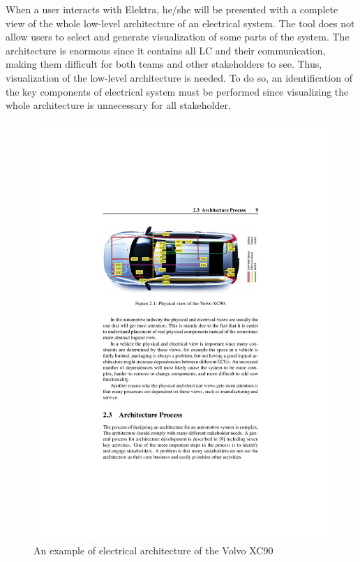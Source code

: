 When a user interacts with Elektra, he/she will be presented with a complete view of the whole low-level architecture of an electrical system. The tool does not allow users to select and generate visualization of some parts of the system. The architecture is enormous since it contains all LC and their communication, making them difficult for both teams and other stakeholders to see. Thus, visualization of the low-level architecture is needed. To do so, an identification of the key components of electrical system must be performed since visualizing the whole architecture is unnecessary for all stakeholder. \\

\begin{figure}[H]
\centering
\captionsetup{justification=centering}
\vspace{0cm}%
\includegraphics[width=0.9\linewidth]{figure/literatures/wallin_physical.pdf}
\caption{An example of electrical architecture of the Volvo XC90~\cite{Wallin}}
\end{figure}

